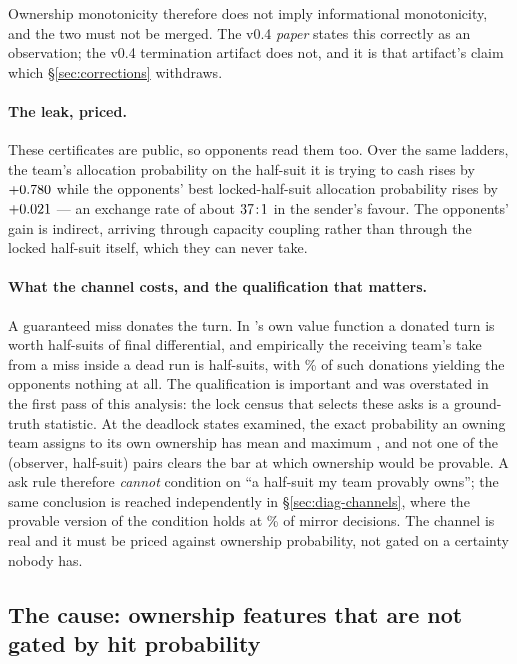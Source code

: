 Ownership monotonicity therefore does not imply informational monotonicity, and
the two must not be merged. The v0.4 \emph{paper} states this correctly as an
observation; the v0.4 termination artifact does not, and it is that artifact's
claim which \S\ref{sec:corrections} withdraws.

\paragraph{The leak, priced.} These certificates are public, so opponents read
them too. Over the same ladders, the team's allocation probability on the
half-suit it is trying to cash rises by $+0.780$ while the opponents' best
locked-half-suit allocation probability rises by $+0.021$ --- an exchange
rate of about $37\!:\!1$ in the sender's favour. The opponents' gain
is indirect, arriving through capacity coupling rather than through the locked
half-suit itself, which they can never take.

\paragraph{What the channel costs, and the qualification that matters.} A
guaranteed miss donates the turn. In \vfour{}'s own value function a donated turn
is worth \numDonationCost{} half-suits of final differential, and empirically the
receiving team's take from a miss inside a dead run is \numDonationDead{}
half-suits, with \numDonationNil\% of such donations yielding the opponents
nothing at all.
The qualification is important and was overstated in the first pass of this
analysis: the lock census that selects these asks is a ground-truth statistic. At
the deadlock states examined, the exact probability an owning team assigns to its
own ownership has mean \numOwnProbMean{} and maximum \numOwnProbMax{}, and not
one of the \numOwnProbPairs{} (observer, half-suit) pairs clears the
\numProvableThresh{} bar at which ownership would be provable. A \vfive{} ask rule therefore \emph{cannot} condition on ``a
half-suit my team provably owns''; the same conclusion is reached independently
in \S\ref{sec:diag-channels}, where the provable version of the condition holds
at \numProvableOwn\% of mirror decisions. The channel is real and it must be
priced against ownership probability, not gated on a certainty nobody has.

\subsection{The cause: ownership features that are not gated by hit probability}
\label{sec:diag-features}

